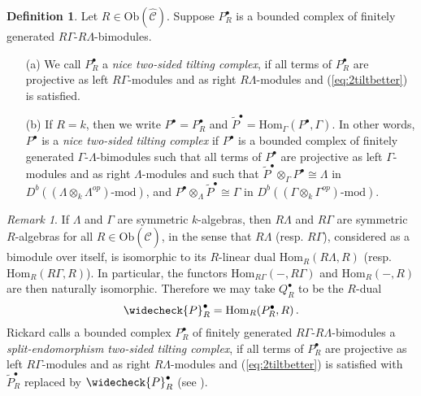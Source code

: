 \documentclass{amsart}
\theoremstyle{plain}
\theoremstyle{definition}
\newtheorem{dfn}[thm]{Definition}
\theoremstyle{remark}
\newtheorem{rem}[thm]{Remark}
\begin{document}
\begin{dfn}
\label{def:nice2sidedtilting}
Let $R\in\mathrm{Ob}(\hat{\mathcal{C}})$. Suppose $P_R^\bullet$ is a bounded complex of finitely 
generated $R\Gamma$-$R\Lambda$-bimodules.
\begin{enumerate}
\item[(a)]
We call $P_R^\bullet$
a \emph{nice two-sided tilting
complex}, if all terms of $P_R^\bullet$ are projective as left $R\Gamma$-modules and
as right $R\Lambda$-modules and (\ref{eq:2tiltbetter}) is satisfied.

\item[(b)]
If $R=k$, then we write $P^\bullet=P_R^\bullet$ and $\widetilde{P}^\bullet = \mathrm{Hom}_{\Gamma}(P^\bullet,\Gamma)$. In other words, $P^\bullet$ is a \emph{nice two-sided tilting complex} if $P^\bullet$ is a 
bounded complex of finitely generated $\Gamma$-$\Lambda$-bimodules such that all terms of
$P^\bullet$ are projective as left $\Gamma$-modules and as right $\Lambda$-modules and such that
$\widetilde{P}^\bullet \otimes_{\Gamma}P^\bullet \cong \Lambda$ in 
$D^b((\Lambda\otimes_k \Lambda^{op})\mbox{-mod})$, and
$P^\bullet \otimes_{\Lambda}\widetilde{P}^\bullet \cong \Gamma$ in $D^b((\Gamma\otimes_k \Gamma^{op})\mbox{-mod})$.
\end{enumerate}
\end{dfn}

\begin{rem}
\label{rem:splitendo}
If $\Lambda$ and $\Gamma$ are symmetric $k$-algebras, then 
$R\Lambda$ and $R\Gamma$ are symmetric $R$-algebras for all
$R\in\mathrm{Ob}(\hat{\mathcal{C}})$, in the sense that $R\Lambda$ (resp. $R\Gamma$),
considered as a bimodule over itself, is isomorphic to its $R$-linear dual
$\mathrm{Hom}_R(R\Lambda,R)$ (resp. $\mathrm{Hom}_R(R\Gamma,R)$). In particular,
the functors $\mathrm{Hom}_{R\Gamma}(-,R\Gamma)$ and $\mathrm{Hom}_R(-,R)$ are
then naturally isomorphic. Therefore we may take $Q_R^\bullet$
to be the $R$-dual
\begin{equation}
\label{eq:kdual}
\widecheck{P}_R^\bullet = \mathrm{Hom}_R(P_R^\bullet,R)\,.
\end{equation}
Rickard calls a bounded complex $P_R^\bullet$ of finitely generated
$R\Gamma$-$R\Lambda$-bimodules a \emph{split-endomorphism two-sided tilting
complex}, if all terms of $P_R^\bullet$ are projective as left $R\Gamma$-modules and
as right $R\Lambda$-modules and (\ref{eq:2tiltbetter}) is satisfied with 
$\widetilde{P}_R^\bullet$ replaced by $\widecheck{P}_R^\bullet$ (see \cite[p. 336]{rickard2}).
\end{rem}
\end{document}
